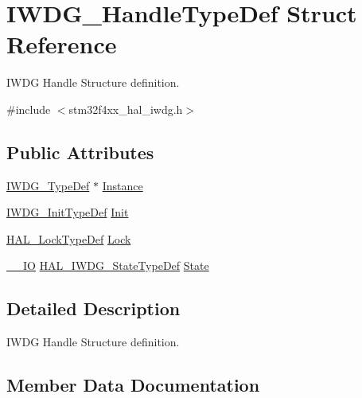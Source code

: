 \hypertarget{struct_i_w_d_g___handle_type_def}{}\section{I\+W\+D\+G\+\_\+\+Handle\+Type\+Def Struct Reference}
\label{struct_i_w_d_g___handle_type_def}


I\+W\+DG Handle Structure definition.  




{\ttfamily \#include $<$stm32f4xx\+\_\+hal\+\_\+iwdg.\+h$>$}

\subsection*{Public Attributes}
\begin{DoxyCompactItemize}
\item 
\hyperlink{struct_i_w_d_g___type_def}{I\+W\+D\+G\+\_\+\+Type\+Def} $\ast$ \hyperlink{struct_i_w_d_g___handle_type_def_ad3fd4c46ef1e9b842328ca4e3290708e}{Instance}
\item 
\hyperlink{struct_i_w_d_g___init_type_def}{I\+W\+D\+G\+\_\+\+Init\+Type\+Def} \hyperlink{struct_i_w_d_g___handle_type_def_ae308075a425af205912feb4059c6f213}{Init}
\item 
\hyperlink{stm32f4xx__hal__def_8h_ab367482e943333a1299294eadaad284b}{H\+A\+L\+\_\+\+Lock\+Type\+Def} \hyperlink{struct_i_w_d_g___handle_type_def_a89ec8a98b121ce7167707d4af23a822d}{Lock}
\item 
\hyperlink{core__sc300_8h_aec43007d9998a0a0e01faede4133d6be}{\+\_\+\+\_\+\+IO} \hyperlink{group___i_w_d_g___exported___types_ga61699dc6f24a3edecddd16018560d0e5}{H\+A\+L\+\_\+\+I\+W\+D\+G\+\_\+\+State\+Type\+Def} \hyperlink{struct_i_w_d_g___handle_type_def_ad0e66d3745ab620bd7f6138880a8f299}{State}
\end{DoxyCompactItemize}


\subsection{Detailed Description}
I\+W\+DG Handle Structure definition. 

\subsection{Member Data Documentation}
